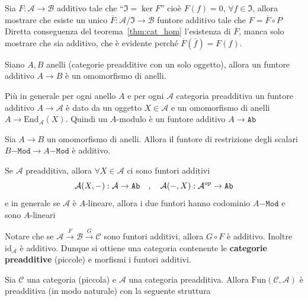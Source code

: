 \begin{eser}{}
    Sia \(F : \mathcal{A} \to \mathcal{B}\) additivo tale che ``\(\mathfrak{I} = \ker F\)'' cioè \(F{(f)} = 0 \), \(\forall f \in \mathfrak{I}\), allora mostrare che esiste un unico \(\overline{F} : \mathcal{A}/\mathfrak{I} \to \mathcal{B}\) funtore additivo tale che \(F = \overline{F} \circ P\) 
    \tcblower
    Diretta conseguenza del teorema~\ref{thm:cat_hom} l'esistenza di
    \(\overline{F}\), manca solo mostrare che sia additivo, che è evidente
    perché \(\overline{F}{(\overline{f})} = F{(f)}\).
\end{eser}

\begin{example}{}
    Siano \(A, B\) anelli (categorie preadditive con un solo oggetto), allora un
    funtore additivo \(A\to B\) è un omomorfismo di anelli.

    Più in generale per ogni anello \(A\) e per ogni \(\mathcal{A}\) categoria
    preadditiva un funtore additivo \( A \to \mathcal{A}\) è dato da un oggetto
    \(X \in \mathcal{A}\) e un omomorfismo di anelli \(A \to \mathrm{End}_\mathcal{A}{(X)}\).
    Quindi un \(A\)-modulo è un funtore additivo \(A \to \mathtt{Ab}\) 
\end{example}

\begin{example}{}
    Sia \(A\to B\) un omomorfismo di anelli. Allora il funtore di restrizione
    degli scalari \(B\mathtt{-Mod} \to A\mathtt{-Mod}\) è additivo.
\end{example}

\begin{example}{}
    Se \(\mathcal{A}\) preadditiva, allora \(\forall X \in \mathcal{A}\) ci sono
    funtori additivi
    \[
      \mathcal{A}{(X, \--)} : \mathcal{A} \to \mathtt{Ab} \quad , \quad \mathcal{A}{(\-- , X)} : \mathcal{A}^{op} \to \mathtt{Ab}
    \]
    e in generale se \(
    \mathcal{A}\) è \(A\)-lineare, allora i due funtori hanno codominio \(A\mathtt{-Mod}\) 
    e sono \(A\)-lineari
\end{example}

Notare che se \(\mathcal{A} \overset{F}{\to } \mathcal{B} \overset{G}{\to } \mathcal{\mathcal{C}}\) 
sono funtori additivi, allora \(G \circ F\) è additivo.
Inoltre \(\mathrm{id}_\mathcal{A}\) è additivo. 
Dunque si ottiene una categoria contenente le \textbf{categorie preadditive}
(piccole) e morfismi i funtori additivi.

    Sia \(\mathcal{\mathcal{C}}\) una categoria (piccola) e \(\mathcal{A}\) una categoria
    preadditiva. Allora \(\mathrm{Fun}{(\mathcal{\mathcal{C}}, \mathcal{A})}\) è
    preadditiva (in modo naturale) con la seguente struttura

